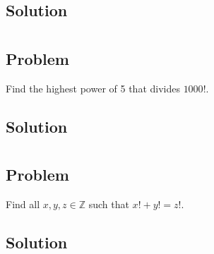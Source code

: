\documentclass[12pt]{article}
\newcommand{\Z}    [0]{\mathbb{Z}                   }
\begin{document}
\subsection{Solution}



\section{}

\subsection{Problem}
Find the highest power of 5 that divides $1000!$.

\subsection{Solution}



\section{}

\subsection{Problem}
Find all $x, y, z \in \Z$ such that $x! + y! = z!$.

\subsection{Solution}
\end{document}
